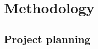 \documentclass[11pt,a4paper]{article}
\begin{document}

\section{Methodology}



\subsection{Project planning}
\end{document}
